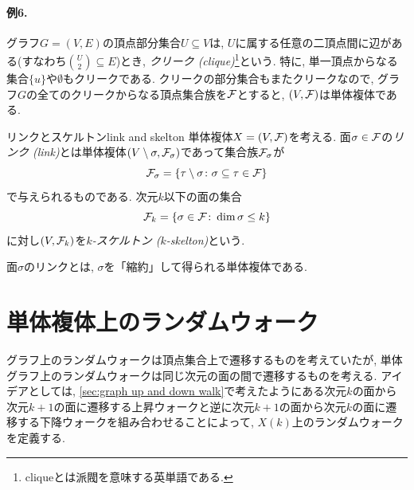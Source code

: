 \paragraph*{例6.}
グラフ$G=(V,E)$の頂点部分集合$U\subseteq V$は, $U$に属する任意の二頂点間に辺がある(すなわち$\binom{U}{2}\subseteq E$)とき, \emph{クリーク (clique)}\footnote{cliqueとは派閥を意味する英単語である.}という.
特に, 単一頂点からなる集合$\{u\}$や$\emptyset$もクリークである.
クリークの部分集合もまたクリークなので,
グラフ$G$の全てのクリークからなる頂点集合族を$\F$とすると, $(V,\F)$は単体複体である.

\begin{definition}{リンクとスケルトン}{link and skelton}
    単体複体$X=(V,\F)$を考える.
    面$\sigma \in \F$の\emph{リンク (link)}とは単体複体$(V\setminus \sigma, \F_{\sigma})$であって集合族$\F_\sigma$が
    \[
        \F_\sigma = \cbra*{ \tau \setminus \sigma \colon \sigma \subseteq \tau \in \F }
    \]
    で与えられるものである.
    次元$k$以下の面の集合
    \[
        \F_k = \cbra*{ \sigma \in \F \colon \dim \sigma \le k}
    \]
    に対し$(V,\F_k)$を\emph{$k$-スケルトン ($k$-skelton)}という.
\end{definition}
面$\sigma$のリンクとは, $\sigma$を「縮約」して得られる単体複体である.



\section{単体複体上のランダムウォーク}
グラフ上のランダムウォークは頂点集合上で遷移するものを考えていたが,
単体グラフ上のランダムウォークは同じ次元の面の間で遷移するものを考える.
アイデアとしては, \cref{sec:graph up and down walk}で考えたようにある次元$k$の面から次元$k+1$の面に遷移する上昇ウォークと逆に次元$k+1$の面から次元$k$の面に遷移する下降ウォークを組み合わせることによって, $X(k)$上のランダムウォークを定義する.


